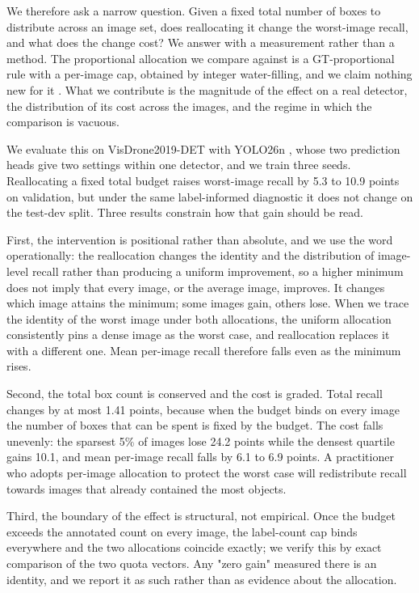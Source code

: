 \documentclass[sn-mathphys,Numbered]{sn-jnl}
\begin{document}
We therefore ask a narrow question. Given a fixed total number of boxes to distribute across an image set, does reallocating it change the worst-image recall, and what does the change cost? We answer with a measurement rather than a method. The proportional allocation we compare against is a GT-proportional rule with a per-image cap, obtained by integer water-filling, and we claim nothing new for it \cite{bertsekas1992data,hardy1934inequalities}. What we contribute is the magnitude of the effect on a real detector, the distribution of its cost across the images, and the regime in which the comparison is vacuous.

We evaluate this on VisDrone2019-DET \cite{zhu2021visdrone} with YOLO26n \cite{jocher2026yolo26}, whose two prediction heads give two settings within one detector, and we train three seeds. Reallocating a fixed total budget raises worst-image recall by 5.3 to 10.9 points on validation, but under the same label-informed diagnostic it does not change on the test-dev split. Three results constrain how that gain should be read.

First, the intervention is positional rather than absolute, and we use the word operationally: the reallocation changes the identity and the distribution of image-level recall rather than producing a uniform improvement, so a higher minimum does not imply that every image, or the average image, improves. It changes which image attains the minimum; some images gain, others lose. When we trace the identity of the worst image under both allocations, the uniform allocation consistently pins a dense image as the worst case, and reallocation replaces it with a different one. Mean per-image recall therefore falls even as the minimum rises.

Second, the total box count is conserved and the cost is graded. Total recall changes by at most 1.41 points, because when the budget binds on every image the number of boxes that can be spent is fixed by the budget. The cost falls unevenly: the sparsest 5\% of images lose 24.2 points while the densest quartile gains 10.1, and mean per-image recall falls by 6.1 to 6.9 points. A practitioner who adopts per-image allocation to protect the worst case will redistribute recall towards images that already contained the most objects.

Third, the boundary of the effect is structural, not empirical. Once the budget exceeds the annotated count on every image, the label-count cap binds everywhere and the two allocations coincide exactly; we verify this by exact comparison of the two quota vectors. Any "zero gain" measured there is an identity, and we report it as such rather than as evidence about the allocation.
\end{document}
